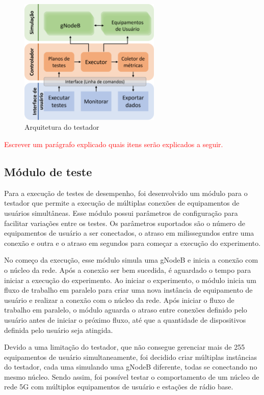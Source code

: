 \begin{figure}[!ht]
    \centering
    \includegraphics[width=0.6\textwidth]{TG2/Chapters/Soluction/Figures/Arquitetura-Componentes.png}
    \caption{Arquitetura do testador}
    \label{fig:tester_arch}
\end{figure}


\textcolor{red}{Escrever um parágrafo explicado quais itens serão explicados a seguir.}

\subsection{Módulo de teste}

Para a execução de testes de desempenho, foi desenvolvido um módulo para o testador que permite a execução de múltiplas conexões de equipamentos de usuários simultâneas.
Esse módulo possui parâmetros de configuração para facilitar variações entre os testes. Os parâmetros suportados são o número de equipamentos de usuário a ser conectados, o atraso em milissegundos entre uma conexão e outra e o atraso em segundos para começar a execução do experimento.

No começo da execução, esse módulo simula uma gNodeB e inicia a conexão com o núcleo da rede. Após a conexão ser bem sucedida, é aguardado o tempo para iniciar a execução do experimento.
Ao iniciar o experimento, o módulo inicia um fluxo de trabalho em paralelo para criar uma nova instância de equipamento de usuário e realizar a conexão com o núcleo da rede.
Após iniciar o fluxo de trabalho em paralelo, o módulo aguarda o atraso entre conexões definido pelo usuário antes de iniciar o próximo fluxo, até que a quantidade de dispositivos definida pelo usuário seja atingida.

Devido a uma limitação do testador, que não consegue gerenciar mais de 255 equipamentos de usuário simultaneamente, foi decidido criar múltiplas instâncias do testador, cada uma simulando uma gNodeB diferente, todas se conectando no mesmo núcleo.
Sendo assim, foi possível testar o comportamento de um núcleo de rede 5G com múltiplos equipamentos de usuário e estações de rádio base.

